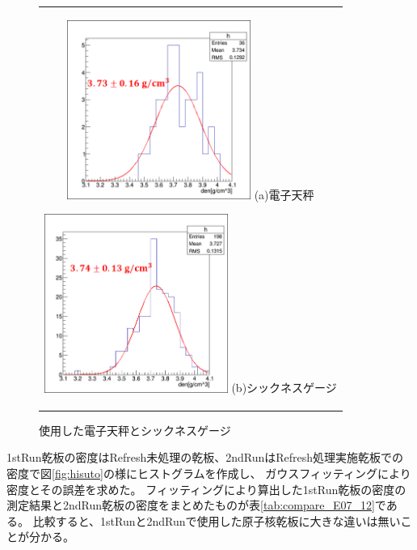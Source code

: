 \documentclass[12pt,a4paper]{jarticle}
\begin{document}
\begin{figure}[htbp]
  \centering
      \begin{tabular}{c}
        \begin{minipage}{0.5\hsize}
          \centering
            \includegraphics[clip, width=60mm]{1stRun_thin_den.png}
            \hspace{1.6cm} (a)電子天秤
        \end{minipage}
        
        \begin{minipage}{0.5\hsize}
          \centering
            \includegraphics[clip, width=60mm]{2ndRun_thin_den.png}
            \hspace{1.6cm} (b)シックネスゲージ
        \end{minipage}
    
      \end{tabular}
      \caption{使用した電子天秤とシックネスゲージ\label{fig:tennbinn_thicknessgage}}
\end{figure}
\par
1stRun乾板の密度はRefresh未処理の乾板、2ndRunはRefresh処理実施乾板での密度で図\ref{fig:hisuto}の様にヒストグラムを作成し、
ガウスフィッティングにより密度とその誤差を求めた。
フィッティングにより算出した1stRun乾板の密度の測定結果と2ndRun乾板の密度をまとめたものが表\ref{tab:compare_E07_12}である。
比較すると、1stRunと2ndRunで使用した原子核乾板に大きな違いは無いことが分かる。
\end{document}
